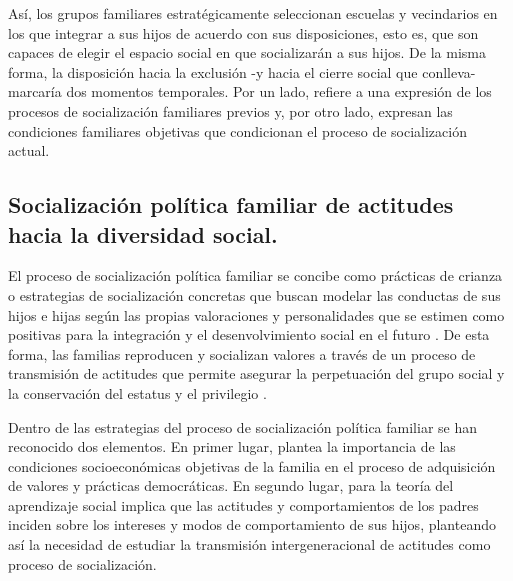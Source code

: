 \documentclass[12pt,twoside]{templates/facsothesis}
\begin{document}
Así, los grupos familiares estratégicamente seleccionan escuelas y vecindarios en los que integrar a sus hijos de acuerdo con sus disposiciones, esto es, que son capaces de elegir el espacio social en que socializarán a sus hijos. De la misma forma, la disposición hacia la exclusión -y hacia el cierre social que conlleva- marcaría dos momentos temporales. Por un lado, refiere a una expresión de los procesos de socialización familiares previos y, por otro lado, expresan las condiciones familiares objetivas que condicionan el proceso de socialización actual.

\hypertarget{socializaciuxf3n-poluxedtica-familiar-de-actitudes-hacia-la-diversidad-social.}{%
\subsection{Socialización política familiar de actitudes hacia la diversidad social.}\label{socializaciuxf3n-poluxedtica-familiar-de-actitudes-hacia-la-diversidad-social.}}

El proceso de socialización política familiar se concibe como prácticas de crianza o estrategias de socialización concretas que buscan modelar las conductas de sus hijos e hijas según las propias valoraciones y personalidades que se estimen como positivas para la integración y el desenvolvimiento social en el futuro \citep{ramirez_padres_2005}. De esta forma, las familias reproducen y socializan valores a través de un proceso de transmisión de actitudes que permite asegurar la perpetuación del grupo social y la conservación del estatus y el privilegio \citep{bourdieu_reproduccion_1998, bernstein_theoretical_2005}.

Dentro de las estrategias del proceso de socialización política familiar se han reconocido dos elementos. En primer lugar, \citet{lipset_hombre_1997} plantea la importancia de las condiciones socioeconómicas objetivas de la familia en el proceso de adquisición de valores y prácticas democráticas. En segundo lugar, para \citet{bandura_sociallearning_1969} la teoría del aprendizaje social implica que las actitudes y comportamientos de los padres inciden sobre los intereses y modos de comportamiento de sus hijos, planteando así la necesidad de estudiar la transmisión intergeneracional de actitudes como proceso de socialización.
\end{document}
